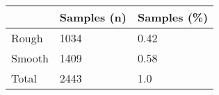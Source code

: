 \begin{tabular}{lll}
\toprule
{} & Samples (n) & Samples (\%) \\
\midrule
Rough  &        1034 &        0.42 \\
Smooth &        1409 &        0.58 \\
Total  &        2443 &         1.0 \\
\bottomrule
\end{tabular}

